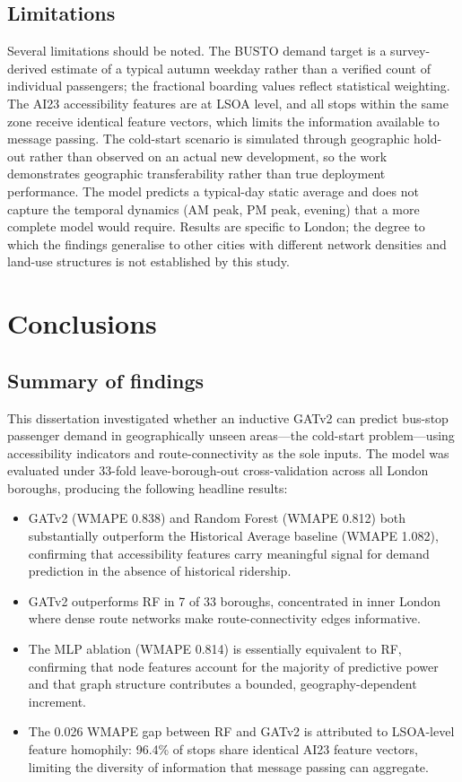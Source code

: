 \documentclass[12pt,a4paper]{report}
\begin{document}
\section{Limitations}
\label{sec:limitations}
Several limitations should be noted. The BUSTO demand target is a
survey-derived estimate of a typical autumn weekday rather than a verified
count of individual passengers; the fractional boarding values reflect
statistical weighting. The AI23 accessibility features are at LSOA level,
and all stops within the same zone receive identical feature vectors, which
limits the information available to message passing. The cold-start scenario
is simulated through geographic hold-out rather than observed on an actual
new development, so the work demonstrates geographic transferability rather
than true deployment performance. The model predicts a typical-day static
average and does not capture the temporal dynamics (AM peak, PM peak, evening)
that a more complete model would require. Results are specific to London; the
degree to which the findings generalise to other cities with different network
densities and land-use structures is not established by this study.


\chapter{Conclusions}
\label{ch:conclusion}

\section{Summary of findings}
This dissertation investigated whether an inductive GATv2 can predict bus-stop
passenger demand in geographically unseen areas---the cold-start problem---using
accessibility indicators and route-connectivity as the sole inputs. The model
was evaluated under 33-fold leave-borough-out cross-validation across all London
boroughs, producing the following headline results:

\begin{itemize}
  \item GATv2 (WMAPE 0.838) and Random Forest (WMAPE 0.812) both substantially
  outperform the Historical Average baseline (WMAPE 1.082), confirming that
  accessibility features carry meaningful signal for demand prediction in the
  absence of historical ridership.
  \item GATv2 outperforms RF in 7 of 33 boroughs, concentrated in inner London
  where dense route networks make route-connectivity edges informative.
  \item The MLP ablation (WMAPE 0.814) is essentially equivalent to RF,
  confirming that node features account for the majority of predictive power
  and that graph structure contributes a bounded, geography-dependent increment.
  \item The 0.026 WMAPE gap between RF and GATv2 is attributed to LSOA-level
  feature homophily: 96.4\% of stops share identical AI23 feature vectors,
  limiting the diversity of information that message passing can aggregate.
\end{itemize}
\end{document}

